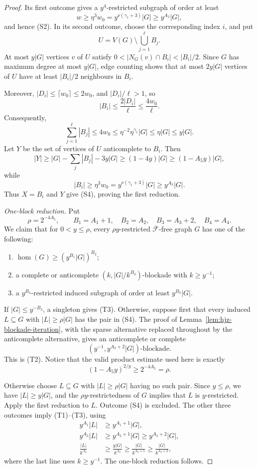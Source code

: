 \documentclass[11pt]{article}
\numberwithin{equation}{section}
\theoremstyle{plain}
\theoremstyle{definition}
\begin{document}
\begin{proof}
Its first outcome gives a $y^4$-restricted subgraph of order at least
\[
 w\geq\eta^3w_0
      =y^{\nu(\gamma_1+3)}|G|
      \geq y^{A_3}|G|,
\]
and hence (S2).  In its second outcome, choose the corresponding
index $i$, and put
\[
                  U=V(G)\setminus\bigcup_{j=1}^{\ell}B_j.
\]
At most $y|G|$ vertices $v$ of $U$ satisfy
$0<|N_G(v)\cap B_i|<|B_i|/2$.  Since $G$ has maximum degree at most
$y|G|$, edge counting shows that at most $2y|G|$ vertices of $U$ have
at least $|B_i|/2$ neighbours in $B_i$.

Moreover, $|D_i|\leq\lceil w_0\rceil\leq2w_0$, and
$|D_i|/\ell>1$, so
\[
 |B_i|\leq\frac{2|D_i|}{\ell}\leq\frac{4w_0}{\ell}.
\]
Consequently,
\[
 \sum_{j=1}^{\ell}|B_j|
       \leq4w_0
       \leq\eta^{-2}\eta^{\gamma_1}|G|
       \leq\eta|G|
       \leq y|G|.
\]
Let $Y$ be the set of vertices of $U$ anticomplete to $B_i$.  Then
\[
 |Y|\geq |G|-\sum_j|B_j|-3y|G|
       \geq(1-4y)|G|
       \geq(1-A_5y)|G|,
\]
while
\[
 |B_i|\geq\eta^3w_0
        =y^{\nu(\gamma_1+3)}|G|
        \geq y^{A_3}|G|.
\]
Thus $X=B_i$ and $Y$ give (S4), proving the first reduction.

\medskip
\noindent\emph{One-block reduction.}
Put
\[
 \rho=2^{-4A_5},\qquad
 B_1=A_1+1,\quad B_2=A_2,\quad
 B_3=A_3+2,\quad B_4=A_4.
\]
We claim that for $0<y\leq\rho$, every
$\rho y$-restricted $\overline{\mathcal F}$-free graph $G$ has one
of the following:
\begin{enumerate}[label=(T\arabic*)]
\item $\operatorname{hom}(G)\geq(y^{B_1}|G|)^{B_2}$;
\item a complete or anticomplete
      $(k,|G|/k^{B_3})$-blockade with $k\geq y^{-1}$;
\item a $y^{B_4}$-restricted induced subgraph of order at least
      $y^{B_3}|G|$.
\end{enumerate}

If $|G|\leq y^{-B_3}$, a singleton gives (T3).  Otherwise, suppose
first that every induced $L\subseteq G$ with $|L|\geq\rho|G|$ has
the pair in (S4).  The proof of
Lemma~\ref{lem:hjz-blockade-iteration}, with the sparse alternative
replaced throughout by the anticomplete alternative, gives an
anticomplete or complete
\[
             (y^{-1},y^{A_3+2}|G|)\text{-blockade}.
\]
This is (T2).  Notice that the valid product estimate used here is
exactly
\[
                  (1-A_5y)^{2/y}\geq2^{-4A_5}=\rho.
\]

Otherwise choose $L\subseteq G$ with $|L|\geq\rho|G|$ having no such
pair.  Since $y\leq\rho$, we have $|L|\geq y|G|$, and the
$\rho y$-restrictedness of $G$ implies that $L$ is $y$-restricted.
Apply the first reduction to $L$.  Outcome (S4) is excluded.  The
other three outcomes imply (T1)--(T3), using
\[
 \begin{split}
 y^{A_1}|L|&\geq y^{A_1+1}|G|,\\
 y^{A_3}|L|&\geq y^{A_3+1}|G|
                         \geq y^{A_3+2}|G|,\\
 \frac{|L|}{k^{A_3}}
   &\geq\frac{y|G|}{k^{A_3}}
    \geq\frac{|G|}{k^{A_3+1}}
    \geq\frac{|G|}{k^{A_3+2}},
 \end{split}
\]
where the last line uses $k\geq y^{-1}$.  The one-block reduction
follows.


\end{proof}
\end{document}
